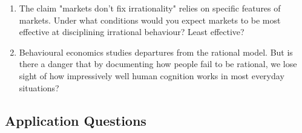 \documentclass[12pt, letterpaper]{article}
\begin{document}
\begin{enumerate}
\item The claim "markets don't fix irrationality" relies on specific features of markets. Under what conditions would you expect markets to be most effective at disciplining irrational behaviour? Least effective?

\item Behavioural economics studies departures from the rational model. But is there a danger that by documenting how people fail to be rational, we lose sight of how impressively well human cognition works in most everyday situations?
\end{enumerate}


\subsection{Application Questions}
\end{document}
